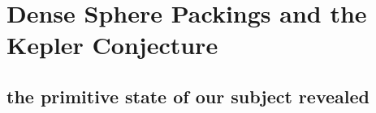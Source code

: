%
%
%
%
%
%
%






\section{Dense Sphere Packings and the Kepler Conjecture}

\subsection{the primitive state of our subject revealed}



